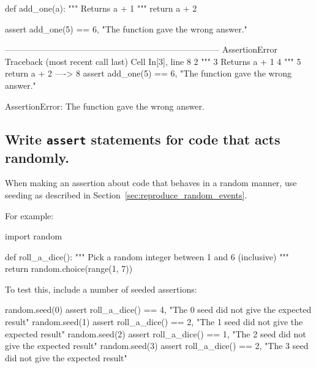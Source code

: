 \begin{pyin}
def add_one(a):
    """
    Returns a + 1
    """
    return a + 2


assert add_one(5) == 6, "The function gave the wrong answer."
\end{pyin}





\begin{raw}
---------------------------------------------------------------------------
AssertionError                            Traceback (most recent call last)
Cell In[3], line 8
      2     """
      3     Returns a + 1
      4     """
      5     return a + 2
----> 8 assert add_one(5) == 6, "The function gave the wrong answer."

AssertionError: The function gave the wrong answer.
\end{raw}






\subsection{Write \texttt{assert} statements for code that acts randomly.}

When making an assertion about code that behaves in a random manner, use
seeding as described in Section~\ref{sec:reproduce_random_events}.


For example:




\begin{pyin}
import random


def roll_a_dice():
    """
    Pick a random integer between 1 and 6 (inclusive)
    """
    return random.choice(range(1, 7))
\end{pyin}





To test this, include a number of seeded assertions:




\begin{pyin}
random.seed(0)
assert roll_a_dice() == 4, "The 0 seed did not give the expected result"
random.seed(1)
assert roll_a_dice() == 2, "The 1 seed did not give the expected result"
random.seed(2)
assert roll_a_dice() == 1, "The 2 seed did not give the expected result"
random.seed(3)
assert roll_a_dice() == 2, "The 3 seed did not give the expected result"
\end{pyin}






